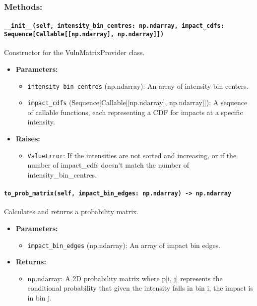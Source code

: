 \documentclass{article}
\begin{document}
\subsubsection{Methods:}

\paragraph{\texttt{\_\_init\_\_(self, intensity\_bin\_centres: np.ndarray, impact\_cdfs: Sequence[Callable[[np.ndarray], np.ndarray]])}}

Constructor for the VulnMatrixProvider class.

\begin{itemize}
    \item \textbf{Parameters:}
    \begin{itemize}
        \item \texttt{intensity\_bin\_centres} (np.ndarray): An array of intensity bin centers.
        \item \texttt{impact\_cdfs} (Sequence[Callable[[np.ndarray], np.ndarray]]): A sequence of callable functions, each representing a CDF for impacts at a specific intensity.
    \end{itemize}
    \item \textbf{Raises:}
    \begin{itemize}
        \item \texttt{ValueError}: If the intensities are not sorted and increasing, or if the number of impact\_cdfs doesn't match the number of intensity\_bin\_centres.
    \end{itemize}
\end{itemize}

\paragraph{\texttt{to\_prob\_matrix(self, impact\_bin\_edges: np.ndarray) -> np.ndarray}}

Calculates and returns a probability matrix.

\begin{itemize}
    \item \textbf{Parameters:}
    \begin{itemize}
        \item \texttt{impact\_bin\_edges} (np.ndarray): An array of impact bin edges.
    \end{itemize}
    \item \textbf{Returns:}
    \begin{itemize}
        \item np.ndarray: A 2D probability matrix where p[i, j] represents the conditional probability that given the intensity falls in bin i, the impact is in bin j.
    \end{itemize}
\end{itemize}
\end{document}
